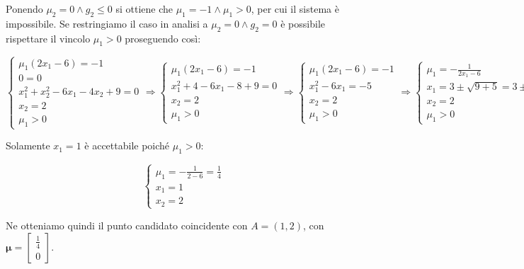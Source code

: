 \documentclass[\main/main.tex]{subfiles}
\begin{document}
Ponendo $\mu_2 = 0 \land g_2 \leq 0$ si ottiene che $\mu_1 = -1 \land \mu_1 > 0$, per cui il sistema è impossibile. Se restringiamo il caso in analisi a $\mu_2 = 0 \land g_2 = 0$ è possibile rispettare il vincolo $\mu_1 > 0$ proseguendo così:

\[
	\begin{cases}
		\mu_1(2x_1 - 6) = -1        \\
		0 = 0                       \\
		x^2_1+x^2_2-6x_1-4x_2+9 = 0 \\
		x_2 = 2                     \\
		\mu_1 > 0
	\end{cases}
	\Rightarrow
	\begin{cases}
		\mu_1(2x_1 - 6) = -1 \\
		x^2_1+4-6x_1-8+9 = 0 \\
		x_2 = 2              \\
		\mu_1 > 0
	\end{cases}
	\Rightarrow
	\begin{cases}
		\mu_1(2x_1 - 6) = -1 \\
		x^2_1-6x_1 = -5      \\
		x_2 = 2              \\
		\mu_1 > 0
	\end{cases}
	\Rightarrow
	\begin{cases}
		\mu_1 = -\frac{1}{2x_1 - 6}               \\
		x_1 = 3 \pm \sqrt{9 + 5} = 3 \pm \sqrt{4} \\
		x_2 = 2                                   \\
		\mu_1 > 0
	\end{cases}
\]

Solamente $x_1 = 1$ è accettabile poiché $\mu_1 > 0$:

\[
	\begin{cases}
		\mu_1 = -\frac{1}{2 - 6} =  \frac{1}{4} \\
		x_1 = 1                                 \\
		x_2 = 2
	\end{cases}
\]

Ne otteniamo quindi il punto candidato coincidente con $A = (1, 2)$, con $\bm{\mu} = \begin{bmatrix}
		\frac{1}{4} \\
		0
	\end{bmatrix}$.
\end{document}
